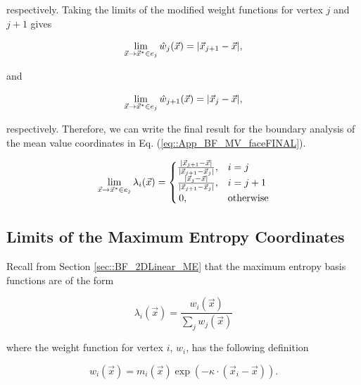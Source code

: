 \noindent respectively. Taking the limits of the modified weight functions for vertex $j$ and $j+1$ gives

\begin{equation}
\label{eq::App_BF_MVBF_weightmod_j}
\lim\displaylimits_{\vec{x} \rightarrow \vec{x}^* \in e_j}\hat{w}_j (\vec{x}) =  | \vec{x}_{j+1} - \vec{x} |,
\end{equation}

\noindent and

\begin{equation}
\label{eq::App_BF_MVBF_weightmod_j1}
\lim\displaylimits_{\vec{x} \rightarrow \vec{x}^* \in e_j} \hat{w}_{j+1} (\vec{x}) = | \vec{x}_j - \vec{x} |,
\end{equation}

\noindent respectively. Therefore, we can write the final result for the boundary analysis of the mean value coordinates in Eq. (\ref{eq::App_BF_MV_faceFINAL}).

\begin{equation}
\label{eq::App_BF_MV_faceFINAL}
\lim\displaylimits_{\vec{x} \rightarrow \vec{x}^* \in e_j} \lambda_i (\vec{x}) = 
\begin{cases}
\frac{| \vec{x}_{j+1} - \vec{x} |}{| \vec{x}_{j+1} - \vec{x}_{j} |},&i=j\\
\frac{| \vec{x}_{j} - \vec{x} |}{| \vec{x}_{j+1} - \vec{x}_{j} |},&i=j+1\\
\,0,&\text{otherwise}
\end{cases}
\end{equation} 

\subsection{Limits of the Maximum Entropy Coordinates}
\label{sec::appendix_BF_Limits_ME}

Recall from Section \ref{sec::BF_2DLinear_ME} that the maximum entropy basis functions are of the form

\begin{equation}
\label{eq::App_BF_MEBF}
\lambda_i (\vec{x}) = \frac{w_i  (\vec{x}) }{\sum_j w_j  (\vec{x}) }
\end{equation}

\noindent where the weight function for vertex $i$, $w_i$, has the following definition

\begin{equation}
\label{eq::App_BF_ME_weights}
w_i (\vec{x})  = m_i(\vec{x}) \exp(-  \kappa \cdot (\vec{x}_i - \vec{x})).
\end{equation}

